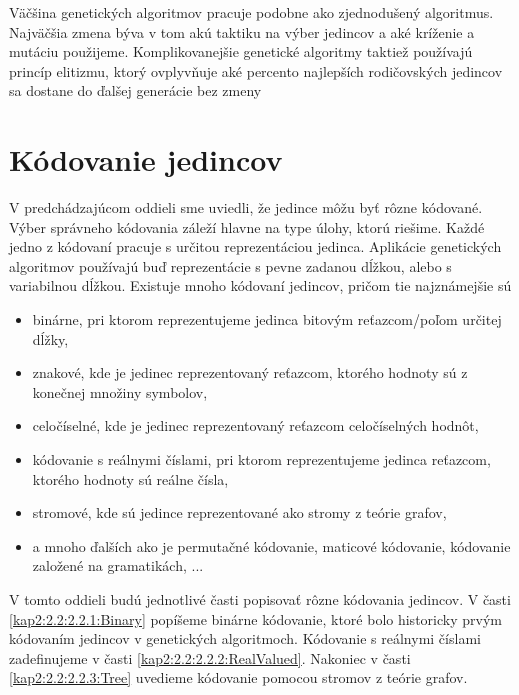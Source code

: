 Väčšina genetických algoritmov pracuje podobne ako zjednodušený algoritmus. Najväčšia zmena býva v tom akú taktiku na výber jedincov a aké kríženie a mutáciu použijeme. Komplikovanejšie genetické algoritmy taktiež používajú princíp elitizmu, ktorý ovplyvňuje aké percento najlepších rodičovských jedincov sa dostane do ďalšej generácie bez zmeny

\section{Kódovanie jedincov}\label{kap2:2.2:Coding}
V predchádzajúcom oddieli sme uviedli, že jedince môžu byť rôzne kódované. Výber správneho kódovania záleží hlavne na type úlohy, ktorú riešime. Každé jedno z kódovaní pracuje s určitou reprezentáciou jedinca. Aplikácie genetických algoritmov používajú buď reprezentácie s pevne zadanou dĺžkou, alebo s variabilnou dĺžkou. Existuje mnoho kódovaní jedincov, pričom tie najznámejšie sú
\begin{itemize}
\item binárne, pri ktorom reprezentujeme jedinca bitovým reťazcom/poľom určitej dĺžky,
\item znakové, kde je jedinec reprezentovaný reťazcom, ktorého hodnoty sú z konečnej množiny symbolov,
\item celočíselné, kde je jedinec reprezentovaný reťazcom celočíselných hodnôt,
\item kódovanie s reálnymi číslami, pri ktorom reprezentujeme jedinca reťazcom, ktorého hodnoty sú reálne čísla,
\item stromové, kde sú jedince reprezentované ako stromy z teórie grafov,
\item a mnoho ďalších ako je permutačné kódovanie, maticové kódovanie, kódovanie založené na gramatikách, ...
\end{itemize} 

V tomto oddieli budú jednotlivé časti popisovať rôzne kódovania jedincov. V časti \ref{kap2:2.2:2.2.1:Binary} popíšeme binárne kódovanie, ktoré bolo historicky prvým kódovaním jedincov v genetických algoritmoch. Kódovanie s reálnymi číslami zadefinujeme v časti \ref{kap2:2.2:2.2.2:RealValued}. Nakoniec v časti \ref{kap2:2.2:2.2.3:Tree} uvedieme kódovanie pomocou stromov z teórie grafov.
